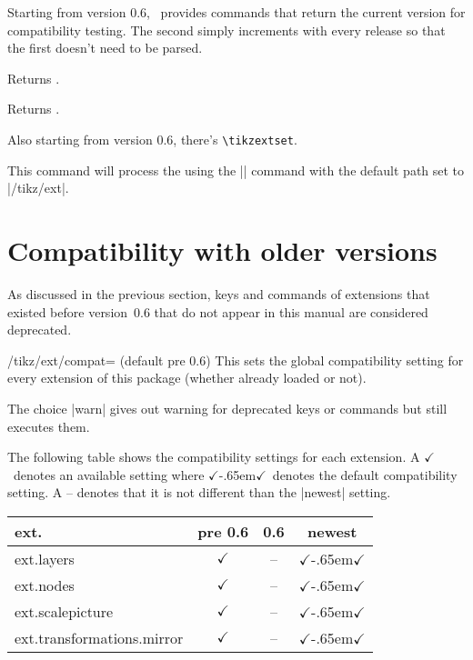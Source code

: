 \begin{multicols}{2}
Starting from version 0.6,
\tikzextname\ provides commands that return the current version for compatibility testing.
The second simply increments with every release
so that the first doesn't need to be parsed.
\begin{command}{\tikzextversion}
  Returns \texttt{\tikzextversion}.
\end{command}
\begin{command}{\tikzextversionnumber}
  Returns \texttt{\tikzextversionnumber}.
\end{command}
%
Also starting from version 0.6, there's \texttt{\textbackslash tikzextset}.
\begin{command}{\tikzextset{}}
  This command will process the  using the
  |\pgfkeys| command with the default path set to |/tikz/ext|.
\end{command}

\newcolumn
\section{Compatibility with older versions}
As discussed in the previous section,
keys and commands of extensions that existed before version~0.6
that do not appear in this manual are considered deprecated.

\begin{key}{/tikz/ext/compat= (default pre 0.6)}
  This sets the global compatibility setting for every extension of this package
  (whether already loaded or not).

  The choice |warn| gives out warning for deprecated keys or commands
  but still executes them.
  
  The following table shows the compatibility settings for each extension.
  \newcommand*\X{$\checkmark$}%
  \newcommand*\Xdef{\X\kern-.65em\X}%
  A \X\ denotes an available setting where \Xdef\ denotes the default compatibility setting.
  A -- denotes that it is not different than the |newest| setting.
  \newcommand*\tabHeader[1]{\rotatebox{90}{#1}}
  \begin{center}
  \begin{tabular}{>{\ttfamily ext.}l ccc}
    \toprule
    \multicolumn{1}{l}{Extension} & pre 0.6 & 0.6 & newest \\ \midrule
    layers                        & \X      & --  & \Xdef  \\
    nodes                         & \X      & --  & \Xdef  \\
    scalepicture                  & \X      & --  & \Xdef  \\
    transformations.mirror        & \X      & --  & \Xdef  \\ \bottomrule
  \end{tabular}
  \end{center}
\end{key}


\end{multicols}

